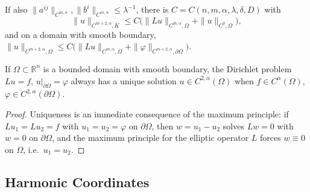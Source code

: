 \begin{corollary}
  \label{cor:pet-ch11-higher-schauder-estimates}
  If also $\|a^{ij}\|_{C^{m,\alpha}},\|b^i\|_{C^{m,\alpha}}\le\lambda^{-1}$,
  there is $C=C(n,m,\alpha,\lambda,\delta,D)$ with
  \[
    \|u\|_{C^{m+2,\alpha},K}\le C\big(\|Lu\|_{C^{m,\alpha},\Omega}+\|u\|_{C^0,\Omega}\big),
  \]
  and on a domain with smooth boundary,
  $\|u\|_{C^{m+2,\alpha},\Omega}\le C\big(\|Lu\|_{C^{m,\alpha},\Omega}+\|\varphi\|_{C^{m+2,\alpha},\partial\Omega}\big)$.
\end{corollary}

\begin{theorem}
  \label{thm:pet-ch11-dirichlet-problem-unique-solution}
  If $\Omega\subset\mathbb{R}^n$ is a bounded domain with smooth boundary, the
  Dirichlet problem $Lu=f$, $u|_{\partial\Omega}=\varphi$ always has a unique
  solution $u\in C^{2,\alpha}(\Omega)$ when $f\in C^\alpha(\Omega)$,
  $\varphi\in C^{2,\alpha}(\partial\Omega)$.
\end{theorem}
\begin{proof}
  Uniqueness is an immediate consequence of the maximum principle: if $Lu_1=Lu_2=f$
  with $u_1=u_2=\varphi$ on $\partial\Omega$, then $w=u_1-u_2$ solves
  $Lw=0$ with $w=0$ on $\partial\Omega$, and the maximum principle for the
  elliptic operator $L$ forces $w\equiv0$ on $\Omega$, i.e.\ $u_1=u_2$.
\end{proof}

\subsection{Harmonic Coordinates}

